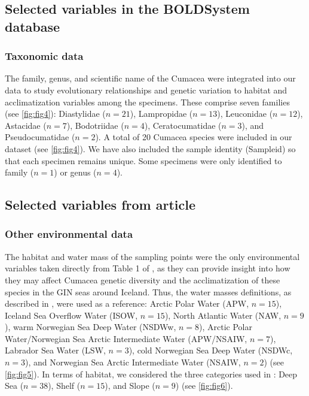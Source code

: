 \subsection{Selected variables in the BOLDSystem database}
\subsubsection{Taxonomic data}
The family, genus, and scientific name of the Cumacea were integrated into our data to study evolutionary relationships and genetic variation to habitat and acclimatization variables among the specimens. These comprise seven families (see \autoref{fig:fig4}): Diastylidae ($n=21$), Lampropidae ($n=13$), Leuconidae ($n=12$), Astacidae ($n=7$), Bodotriidae ($n=4$), Ceratocumatidae ($n=3$), and Pseudocumatidae ($n=2$). A total of 20 Cumacea species were included in our dataset (see \autoref{fig:fig4}). We have also included the sample identity (Sampleid) so that each specimen remains unique. Some specimens were only identified to family ($n=1$) or genus ($n=4$).

\subsection{Selected variables from article \cite{uhlir_adding_2021}}
\subsubsection{Other environmental data}
The habitat and water mass of the sampling points were the only environmental variables taken directly from Table 1 of \citep{uhlir_adding_2021}, as they can provide insight into how they may affect Cumacea genetic diversity and the acclimatization of these species in the GIN seas around Iceland. Thus, the water masses definitions, as described in \citep{uhlir_adding_2021}, were used as a reference: Arctic Polar Water (APW, $n=15$), Iceland Sea Overflow Water (ISOW, $n=15$), North Atlantic Water (NAW, $n=9$), warm Norwegian Sea Deep Water (NSDWw, $n=8$), Arctic Polar Water/Norwegian Sea Arctic Intermediate Water (APW/NSAIW, $n=7$), Labrador Sea Water (LSW, $n=3$), cold Norwegian Sea Deep Water (NSDWc, $n=3$), and Norwegian Sea Arctic Intermediate Water (NSAIW, $n=2$) (see \autoref{fig:fig5}). In terms of habitat, we considered the three categories used in \citep{uhlir_adding_2021}: Deep Sea ($n=38$), Shelf ($n=15$), and Slope ($n=9$) (see \autoref{fig:fig6}).

